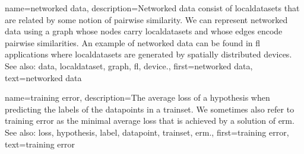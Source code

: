 {name={networked data},
	description={Networked \gls{data} consist of \glspl{localdataset} 
		that are related by some notion of pairwise similarity. We can represent networked 
		\gls{data} using a \gls{graph} whose nodes carry \glspl{localdataset} and whose edges encode 
		pairwise similarities. An example of networked \gls{data} can be found in \gls{fl} applications 
		where \glspl{localdataset} are generated by spatially distributed \glspl{device}.
			\\
		See also: \gls{data}, \gls{localdataset}, \gls{graph}, \gls{fl}, \gls{device}.}, 
	first={networked data},
	text={networked data}  
}

{name={training error},
	description={The average \gls{loss} of a \gls{hypothesis} when 
		predicting the \glspl{label} of the \glspl{datapoint} in a \gls{trainset}. 
		We sometimes also refer to training error as the minimal average \gls{loss} 
		that is achieved by a solution of \gls{erm}.
				\\
		See also: \gls{loss}, \gls{hypothesis}, \gls{label}, \gls{datapoint}, \gls{trainset}, \gls{erm}.},
	first={training error},
	text={training error}  
}

